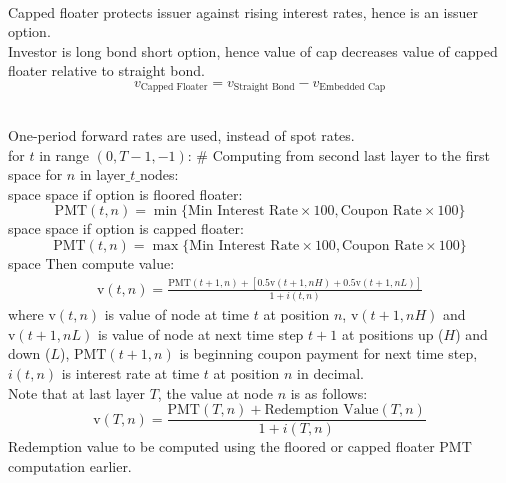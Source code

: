 \begin{remark} \\
Capped floater protects issuer against rising interest rates, hence is an issuer option.\\
Investor is long bond short option, hence value of cap decreases value of capped floater relative to straight bond.
\begin{equation}
v_{\text{Capped Floater}} = v_{\text{Straight Bond}} - v_{\text{Embedded Cap}} \nonumber
\end{equation}
\end{remark}

\begin{method} \\
One-period forward rates are used, instead of spot rates. \\
for $t$ in range $(0, T-1, -1)$: \# Computing from second last layer to the first \\
{\color{white}space} for $n$ in layer$\_t\_$nodes: \\
{\color{white}space} {\color{white}space} if option is floored floater:
\begin{equation}
\text{PMT}(t,n) = \min \{\text{Min Interest Rate} \times 100, \text{Coupon Rate} \times 100\} \nonumber
\end{equation}
{\color{white}space} {\color{white}space} if option is capped floater:
\begin{equation}
\text{PMT}(t,n) = \max \{\text{Min Interest Rate} \times 100, \text{Coupon Rate} \times 100\} \nonumber
\end{equation}
{\color{white}space} Then compute value:
\begin{align}
\text{v}(t,n) = \frac{\text{PMT}(t+1,n)+ [0.5 \text{v}(t+1, nH) + 0.5 \text{v}(t+1, nL)]}{1 + i(t, n)} \nonumber
\end{align}
where $\text{v}(t,n)$ is value of node at time $t$ at position $n$, $\text{v}(t+1,nH)$ and $\text{v}(t+1,nL)$ is value of node at next time step $t+1$ at positions up ($H$) and down ($L$), $\text{PMT}(t+1,n)$ is beginning coupon payment for next time step, $i(t,n)$ is interest rate at time $t$ at position $n$ in decimal. \\
Note that at last layer $T$, the value at node $n$ is as follows:
\begin{equation}
\text{v}(T, n) = \frac{\text{PMT}(T,n) + \text{Redemption Value}(T,n)}{1 + i(T, n)} \nonumber
\end{equation}
Redemption value to be computed using the floored or capped floater PMT computation earlier.
\end{method}

